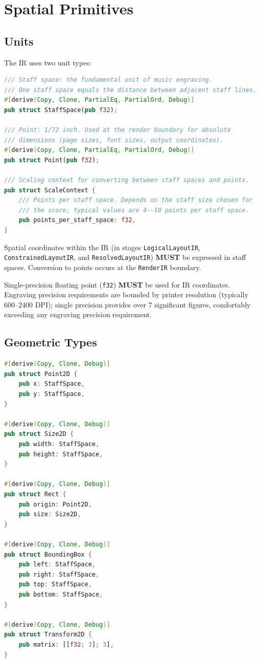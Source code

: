 \documentclass[11pt,letterpaper]{report}
\newcounter{requirement}[chapter]
\newcommand{\MUST}{\textbf{MUST}}
\begin{document}
\section{Spatial Primitives}
\label{sec:layoutir:spatial}

\subsection{Units}

The IR uses two unit types:

\begin{lstlisting}[language=Rust]
/// Staff space: the fundamental unit of music engraving.
/// One staff space equals the distance between adjacent staff lines.
#[derive(Copy, Clone, PartialEq, PartialOrd, Debug)]
pub struct StaffSpace(pub f32);

/// Point: 1/72 inch. Used at the render boundary for absolute
/// dimensions (page sizes, font sizes, output coordinates).
#[derive(Copy, Clone, PartialEq, PartialOrd, Debug)]
pub struct Point(pub f32);

/// Scaling context for converting between staff spaces and points.
pub struct ScaleContext {
    /// Points per staff space. Depends on the staff size chosen for
    /// the score; typical values are 4--10 points per staff space.
    pub points_per_staff_space: f32,
}
\end{lstlisting}

\begin{requirement}
  \label{req:layoutir:staff-space-coordinates}
  Spatial coordinates within the IR (in stages
  \texttt{LogicalLayoutIR}, \texttt{ConstrainedLayoutIR}, and
  \texttt{ResolvedLayoutIR}) \MUST{} be expressed in staff spaces.
  Conversion to points occurs at the \texttt{RenderIR} boundary.

  Single-precision floating point (\texttt{f32}) \MUST{} be used for
  IR coordinates. Engraving precision requirements are bounded by
  printer resolution (typically 600--2400 DPI); single precision
  provides over 7 significant figures, comfortably exceeding any
  engraving precision requirement.
\end{requirement}

\subsection{Geometric Types}

\begin{lstlisting}[language=Rust]
#[derive(Copy, Clone, Debug)]
pub struct Point2D {
    pub x: StaffSpace,
    pub y: StaffSpace,
}

#[derive(Copy, Clone, Debug)]
pub struct Size2D {
    pub width: StaffSpace,
    pub height: StaffSpace,
}

#[derive(Copy, Clone, Debug)]
pub struct Rect {
    pub origin: Point2D,
    pub size: Size2D,
}

#[derive(Copy, Clone, Debug)]
pub struct BoundingBox {
    pub left: StaffSpace,
    pub right: StaffSpace,
    pub top: StaffSpace,
    pub bottom: StaffSpace,
}

#[derive(Copy, Clone, Debug)]
pub struct Transform2D {
    pub matrix: [[f32; 3]; 3],
}
\end{lstlisting}
\end{document}
